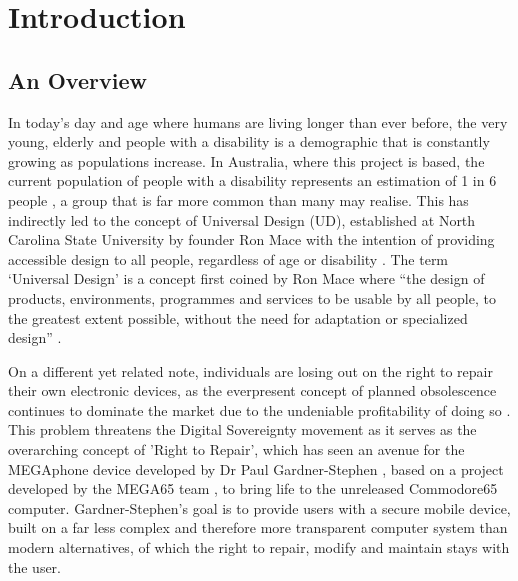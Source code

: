 
\chapter{Introduction}\label{chapter:firstchapter} %

\label{Chapter1} %


\section{An Overview}\label{sec:firstsection} %

In today's day and age where humans are living longer than ever before, the very young, elderly and people with a disability is a demographic that is constantly growing as populations increase.
In Australia, where this project is based, the current population of people with a disability represents an estimation of 1 in 6 people \cite{ausstats}, a group that is far more common than many may realise.
This has indirectly led to the concept of Universal Design (UD), established at North Carolina State University by founder Ron Mace with the intention of providing accessible design to all people, regardless of age or disability \cite{ronald}.
The term ‘Universal Design’ is a concept first coined by Ron Mace where “the design of products, environments, programmes and services to be usable by all people, to the greatest extent possible, without the need for adaptation or specialized design” \cite{nda}. 

On a different yet related note, individuals are losing out on the right to repair their own electronic devices, as the everpresent concept of planned obsolescence continues to dominate the market due to the undeniable profitability of doing so \cite{obsolescence2}.
This problem threatens the Digital Sovereignty movement as it serves as the overarching concept of 'Right to Repair', which has seen an avenue for the MEGAphone device developed by Dr Paul Gardner-Stephen \cite{mobilehistory}, based on a project developed by the MEGA65 team \cite{mega65}, to bring life to the unreleased Commodore65 computer. %
Gardner-Stephen's goal is to provide users with a secure mobile device, built on a far less complex and therefore more transparent computer system than modern alternatives, of which the right to repair, modify and maintain stays with the user.

